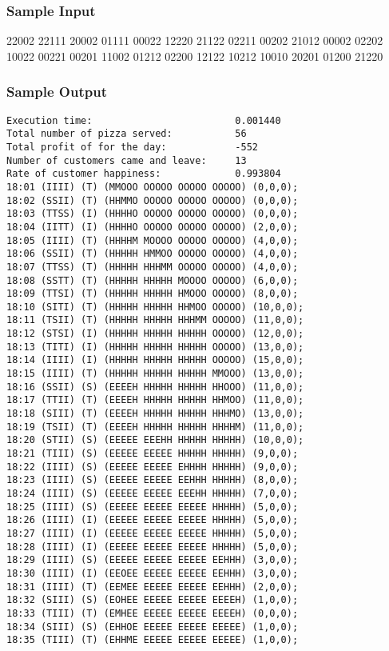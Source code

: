 \documentclass[a4paper]{article}   %
\begin{document}
\begin{CJK}{UTF8}{gbsn}
\begin{spacing}{1.2}
\subsubsection{Sample Input}
22002 22111 20002 01111 00022 12220 21122 02211 00202 21012 00002 02202 10022 00221 00201 11002 01212 02200 12122 10212 10010 20201 01200 21220 

\subsubsection{Sample Output}
\begin{lstlisting}
Execution time:				 			0.001440
Total number of pizza served: 			56
Total profit of for the day: 		 	-552
Number of customers came and leave: 	13
Rate of customer happiness: 		 	0.993804
18:01 (IIII) (T) (MMOOO OOOOO OOOOO OOOOO) (0,0,0);
18:02 (SSII) (T) (HHMMO OOOOO OOOOO OOOOO) (0,0,0);
18:03 (TTSS) (I) (HHHHO OOOOO OOOOO OOOOO) (0,0,0);
18:04 (IITT) (I) (HHHHO OOOOO OOOOO OOOOO) (2,0,0);
18:05 (IIII) (T) (HHHHM MOOOO OOOOO OOOOO) (4,0,0);
18:06 (SSII) (T) (HHHHH HMMOO OOOOO OOOOO) (4,0,0);
18:07 (TTSS) (T) (HHHHH HHHMM OOOOO OOOOO) (4,0,0);
18:08 (SSTT) (T) (HHHHH HHHHH MOOOO OOOOO) (6,0,0);
18:09 (TTSI) (T) (HHHHH HHHHH HMOOO OOOOO) (8,0,0);
18:10 (SITI) (T) (HHHHH HHHHH HHMOO OOOOO) (10,0,0);
18:11 (TSII) (T) (HHHHH HHHHH HHHMM OOOOO) (11,0,0);
18:12 (STSI) (I) (HHHHH HHHHH HHHHH OOOOO) (12,0,0);
18:13 (TITI) (I) (HHHHH HHHHH HHHHH OOOOO) (13,0,0);
18:14 (IIII) (I) (HHHHH HHHHH HHHHH OOOOO) (15,0,0);
18:15 (IIII) (T) (HHHHH HHHHH HHHHH MMOOO) (13,0,0);
18:16 (SSII) (S) (EEEEH HHHHH HHHHH HHOOO) (11,0,0);
18:17 (TTII) (T) (EEEEH HHHHH HHHHH HHMOO) (11,0,0);
18:18 (SIII) (T) (EEEEH HHHHH HHHHH HHHMO) (13,0,0);
18:19 (TSII) (T) (EEEEH HHHHH HHHHH HHHHM) (11,0,0);
18:20 (STII) (S) (EEEEE EEEHH HHHHH HHHHH) (10,0,0);
18:21 (TIII) (S) (EEEEE EEEEE HHHHH HHHHH) (9,0,0);
18:22 (IIII) (S) (EEEEE EEEEE EHHHH HHHHH) (9,0,0);
18:23 (IIII) (S) (EEEEE EEEEE EEHHH HHHHH) (8,0,0);
18:24 (IIII) (S) (EEEEE EEEEE EEEHH HHHHH) (7,0,0);
18:25 (IIII) (S) (EEEEE EEEEE EEEEE HHHHH) (5,0,0);
18:26 (IIII) (I) (EEEEE EEEEE EEEEE HHHHH) (5,0,0);
18:27 (IIII) (I) (EEEEE EEEEE EEEEE HHHHH) (5,0,0);
18:28 (IIII) (I) (EEEEE EEEEE EEEEE HHHHH) (5,0,0);
18:29 (IIII) (S) (EEEEE EEEEE EEEEE EEHHH) (3,0,0);
18:30 (IIII) (I) (EEOEE EEEEE EEEEE EEHHH) (3,0,0);
18:31 (IIII) (T) (EEMEE EEEEE EEEEE EEHHH) (2,0,0);
18:32 (SIII) (S) (EOHEE EEEEE EEEEE EEEEH) (1,0,0);
18:33 (TIII) (T) (EMHEE EEEEE EEEEE EEEEH) (0,0,0);
18:34 (SIII) (S) (EHHOE EEEEE EEEEE EEEEE) (1,0,0);
18:35 (TIII) (T) (EHHME EEEEE EEEEE EEEEE) (1,0,0);

\end{lstlisting}
\end{spacing}
\end{CJK}
\end{document}

